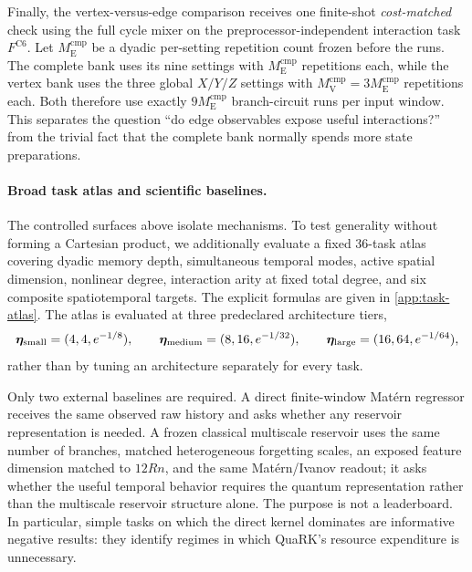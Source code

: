 Finally, the vertex-versus-edge comparison receives one finite-shot
\emph{cost-matched} check using the full cycle mixer on the
preprocessor-independent interaction task $F^{\mathrm{C6}}$.  Let
$M_{\mathrm E}^{\mathrm{cmp}}$ be a dyadic
per-setting repetition count frozen before the runs.  The complete bank uses
its nine settings with $M_{\mathrm E}^{\mathrm{cmp}}$ repetitions each, while
the vertex bank uses the three global $X/Y/Z$ settings with
$M_{\mathrm V}^{\mathrm{cmp}}=3M_{\mathrm E}^{\mathrm{cmp}}$ repetitions each.
Both therefore use exactly $9M_{\mathrm E}^{\mathrm{cmp}}$ branch-circuit runs
per input window.  This separates the question ``do edge observables expose
useful interactions?'' from the trivial fact that the complete bank normally
spends more state preparations.

\paragraph{Broad task atlas and scientific baselines.}
The controlled surfaces above isolate mechanisms.  To test generality without
forming a Cartesian product, we additionally evaluate a fixed 36-task atlas
covering dyadic memory depth, simultaneous temporal modes, active spatial
dimension, nonlinear degree, interaction arity at fixed total degree, and six
composite spatiotemporal targets.  The explicit formulas are given in
\cref{app:task-atlas}.  The atlas is evaluated at three predeclared
architecture tiers,
\begin{equation}
    \bm{\eta}_{\mathrm{small}}=(4,4,e^{-1/8}),\qquad
    \bm{\eta}_{\mathrm{medium}}=(8,16,e^{-1/32}),\qquad
    \bm{\eta}_{\mathrm{large}}=(16,64,e^{-1/64}),
    \label{eq:architecture-tiers}
\end{equation}
rather than by tuning an architecture separately for every task.

Only two external baselines are required.  A direct finite-window Mat\'ern
regressor receives the same observed raw history and asks whether any reservoir
representation is needed.  A frozen classical multiscale reservoir uses the
same number of branches, matched heterogeneous forgetting scales, an exposed
feature dimension matched to $12Rn$, and the same Mat\'ern/Ivanov readout; it
asks whether the useful temporal behavior requires the quantum representation
rather than the multiscale reservoir structure alone.  The purpose is not a
leaderboard.  In particular, simple tasks on which the direct kernel dominates
are informative negative results: they identify regimes in which QuaRK's
resource expenditure is unnecessary.

